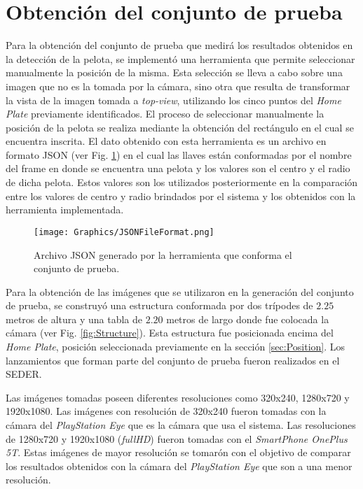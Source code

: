\section{Obtención del conjunto de prueba}

Para la obtención del conjunto de prueba que medirá los resultados obtenidos en la detección de la pelota, se implementó una herramienta que permite seleccionar manualmente la posición de la misma. Esta selección se lleva a cabo sobre una imagen que no es la tomada por la cámara, sino otra que resulta de transformar la vista de la imagen tomada a \textit{top-view}, utilizando los cinco puntos del \textit{Home Plate} previamente identificados. El proceso de seleccionar manualmente la posición de la pelota se realiza mediante la obtención del rectángulo en el cual se encuentra inscrita. El dato obtenido con esta herramienta es un archivo en formato JSON (ver Fig. \ref{fig:JsonFile}) en el cual las llaves están conformadas por el nombre del frame en donde se encuentra una pelota y los valores son el centro y el radio de dicha pelota. Estos valores son los utilizados posteriormente en la comparación entre los valores de centro y radio brindados por el sistema y los obtenidos con la herramienta implementada.

\begin{figure}[!h]
    \centering
	\texttt{[image: Graphics/JSONFileFormat.png]}
    \caption{Archivo JSON generado por la herramienta que conforma el conjunto de prueba.}
    \label{fig:JsonFile}
\end{figure}

Para la obtención de las imágenes que se utilizaron en la generación del conjunto de prueba, se construyó una estructura conformada por dos trípodes de $2.25$ metros de altura y una tabla de $2.20$ metros de largo donde fue colocada la cámara (ver Fig. \ref{fig:Structure}). Esta estructura fue posicionada encima del \textit{Home Plate}, posición seleccionada previamente en la sección \ref{sec:Position}. Los lanzamientos que forman parte del conjunto de prueba fueron realizados en el SEDER.

Las imágenes tomadas poseen diferentes resoluciones como 320x240, 1280x720 y 1920x1080. Las imágenes con resolución de 320x240 fueron tomadas con la cámara del \textit{PlayStation Eye} que es la cámara que usa el sistema. Las resoluciones de 1280x720 y 1920x1080 (\textit{fullHD}) fueron tomadas con el \textit{SmartPhone OnePlus 5T}. Estas imágenes de mayor resolución se tomarón con el objetivo de comparar los resultados obtenidos con la cámara del \textit{PlayStation Eye} que son a una menor resolución.

